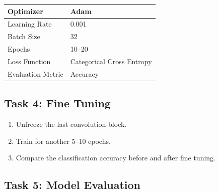 \documentclass[11pt]{article}
\begin{document}
\begin{center}

\begin{tabular}{|p{5cm}|p{6cm}|}

\hline

Optimizer & Adam\\

\hline

Learning Rate & 0.001\\

\hline

Batch Size & 32\\

\hline

Epochs & 10--20\\

\hline

Loss Function &
Categorical Cross Entropy\\

\hline

Evaluation Metric &
Accuracy\\

\hline

\end{tabular}

\end{center}


\subsection*{Task 4: Fine Tuning}

\begin{enumerate}

\item Unfreeze the last convolution block.

\item Train for another 5--10 epochs.

\item Compare the classification accuracy before and after fine tuning.

\end{enumerate}


\subsection*{Task 5: Model Evaluation}
\end{document}
